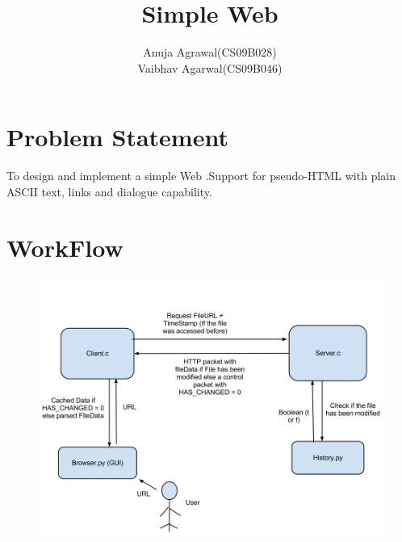 \documentclass[10pt]{article}
\title{\color{Violet}Simple Web}
\author{Anuja Agrawal(CS09B028)\\ Vaibhav Agarwal(CS09B046)}
\begin{document}
\maketitle

\section{\color{Violet}Problem Statement}
To design and implement a simple Web .Support for pseudo-HTML with plain ASCII text, links and dialogue capability.

\section{\color{Violet}WorkFlow}
\begin {figure}[ht]
   \includegraphics[width=1.0\textwidth]{./SRS.png}
 \end{figure}
\end{document}
